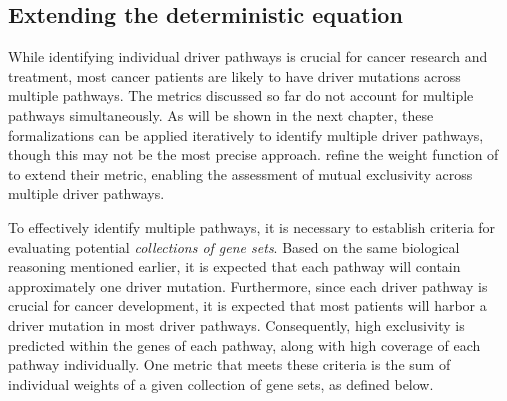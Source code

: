 %
%
%
%

\subsection{Extending the deterministic equation} \label{multi_dendrix_2nd_chap}

While identifying individual driver pathways is crucial for cancer research and treatment, most cancer patients are likely to have driver mutations across multiple pathways. The metrics discussed so far do not account for multiple pathways simultaneously. As will be shown in the next chapter, these formalizations can be applied iteratively to identify multiple driver pathways, though this may not be the most precise approach. \textcite{multi-dendrix} refine the weight function of \textcite{dendrix} to extend their metric, enabling the assessment of mutual exclusivity across multiple driver pathways.

To effectively identify multiple pathways, it is necessary to establish criteria for evaluating potential \textit{collections of gene sets}. Based on the same biological reasoning mentioned earlier, it is expected that each pathway will contain approximately one driver mutation. Furthermore, since each driver pathway is crucial for cancer development, it is expected that most patients will harbor a driver mutation in most driver pathways. Consequently, high exclusivity is predicted within the genes of each pathway, along with high coverage of each pathway individually. One metric that meets these criteria is the sum of individual weights of a given collection of gene sets, as defined below.

